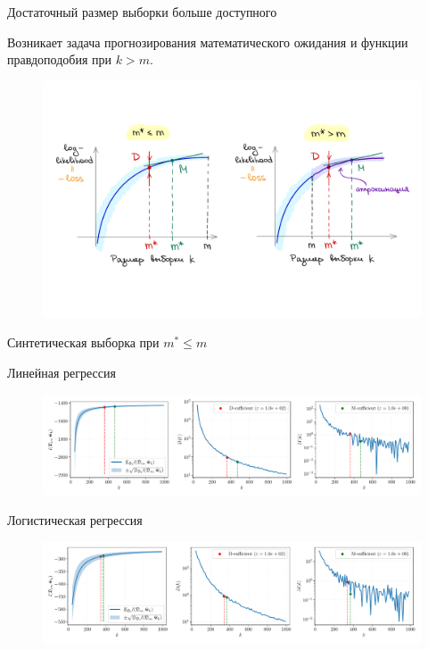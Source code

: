 \documentclass{beamer}
\begin{document}
\begin{frame}{Достаточный размер выборки больше доступного}
    \begin{block}{}
        Возникает задача прогнозирования математического ожидания и функции правдоподобия при $k > m$.
    \end{block}
    \begin{figure}[h!]
        \centering
        \includegraphics[width=\textwidth]{paper/figures/image.pdf}
        \label{image}
    \end{figure}
\end{frame}
\begin{frame}{Синтетическая выборка при $m^* \leqslant m$}
    \begin{center}
        Линейная регрессия
    \end{center}
    \begin{figure}[h!]
        \centering
        \includegraphics[width=\textwidth]{paper/figures/synthetic-regression-sufficient.pdf}
        \label{synthetic-regression-sufficient}
    \end{figure}
    \vspace{-1cm}
    \begin{center}
        Логистическая регрессия
    \end{center}
    \begin{figure}[h!]
        \centering
        \includegraphics[width=\textwidth]{paper/figures/synthetic-classification-sufficient.pdf}
        \label{synthetic-classification-sufficient}
    \end{figure}
\end{frame}
\end{document}
